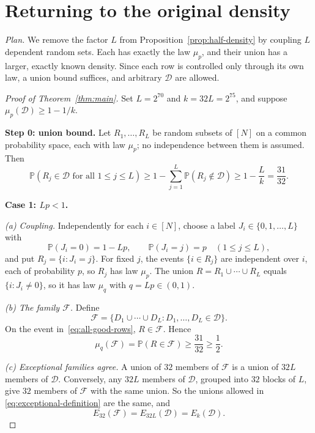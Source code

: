 \documentclass[11pt,letterpaper]{article}
\theoremstyle{definition}
\theoremstyle{remark}
\numberwithin{equation}{section}
\begin{document}
\section{Returning to the original density}
\label{sec:density}

\emph{Plan.} We remove the factor $L$ from Proposition~\ref{prop:half-density} by coupling $L$ dependent random sets. Each has exactly the law $\mu_p$, and their union has a larger, exactly known density. Since each row is controlled only through its own law, a union bound suffices, and arbitrary $\mathcal D$ are allowed.

\begin{proof}[Proof of Theorem~\ref{thm:main}]
Set $L=2^{70}$ and $k=32L=2^{75}$, and suppose $\mu_p(\mathcal D)\ge1-1/k$.

\medskip\noindent\textbf{Step 0: union bound.} Let $R_1,\ldots,R_L$ be random subsets of $[N]$ on a common probability space, each with law $\mu_p$; no independence between them is assumed. Then
\begin{equation}
\label{eq:all-good-rows}
\mathbb P(R_j\in\mathcal D\text{ for all }1\le j\le L)
\ge1-\sum_{j=1}^L\mathbb P(R_j\notin\mathcal D)
\ge1-\frac Lk=\frac{31}{32}.
\end{equation}

\medskip\noindent\textbf{Case 1: $Lp<1$.}

\emph{(a) Coupling.} Independently for each $i\in[N]$, choose a label $J_i\in\{0,1,\ldots,L\}$ with
\[
\mathbb P(J_i=0)=1-Lp,
\qquad
\mathbb P(J_i=j)=p\quad(1\le j\le L),
\]
and put $R_j=\{i:J_i=j\}$. For fixed $j$, the events $\{i\in R_j\}$ are independent over $i$, each of probability $p$, so $R_j$ has law $\mu_p$. The union $R=R_1\cup\cdots\cup R_L$ equals $\{i:J_i\ne0\}$, so it has law $\mu_q$ with $q=Lp\in(0,1)$.

\emph{(b) The family $\mathcal F$.} Define
\[
\mathcal F
=\{D_1\cup\cdots\cup D_L:D_1,\ldots,D_L\in\mathcal D\}.
\]
On the event in~\eqref{eq:all-good-rows}, $R\in\mathcal F$. Hence
\[
\mu_q(\mathcal F)=\mathbb P(R\in\mathcal F)
\ge\frac{31}{32}\ge\frac12.
\]

\emph{(c) Exceptional families agree.} A union of $32$ members of $\mathcal F$ is a union of $32L$ members of $\mathcal D$. Conversely, any $32L$ members of $\mathcal D$, grouped into $32$ blocks of $L$, give $32$ members of $\mathcal F$ with the same union. So the unions allowed in \eqref{eq:exceptional-definition} are the same, and
\[
E_{32}(\mathcal F)=E_{32L}(\mathcal D)=E_k(\mathcal D).
\]


\end{proof}
\end{document}
